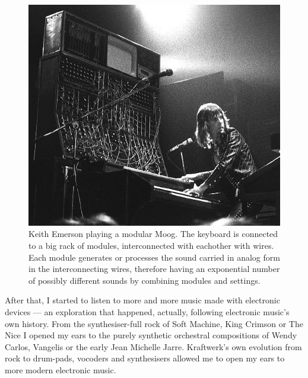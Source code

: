 \begin{figure}[h!]
  \centering
  \includegraphics[width=.7\textwidth]{pic/elpmoog.jpg}
  \caption[Keith Emerson playing a modular Moog]{Keith Emerson playing
    a modular Moog. The keyboard is connected to a big rack of
    modules, interconnected with eachother with wires. Each module
    generates or processes the sound carried in analog form in the
    interconnecting wires, therefore having an exponential number of
    possibly different sounds by combining modules and settings.}
\end{figure}

After that, I started to listen to more and more music made with
electronic devices --- an exploration that happened, actually,
following electronic music's own history. From the synthesiser-full
rock of Soft Machine, King Crimson or The Nice I opened my ears to the
purely synthetic orchestral compositions of Wendy Carlos, Vangelis or
the early Jean Michelle Jarre. Kraftwerk's own evolution from rock to
drum-pads, vocoders and synthesisers allowed me to open my ears to
more modern electronic music.

